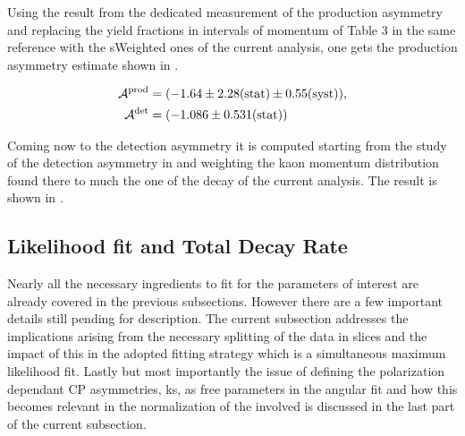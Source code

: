 Using the result from the dedicated \lhcb measurement of the production asymmetry \cite{LHCb-PAPER-2014-042}
and replacing the yield fractions in intervals of \Bs momentum of Table 3 in the same reference with the sWeighted \BsJpsiKst ones of the current analysis,
one gets the production asymmetry estimate shown in .

\begin{subequations}
  \label{exp_assym}
  \begin{align}
    \centering
    \Aprod &= (-1.64 \pm 2.28 \stat \pm 0.55 \syst), \label{prod_assym} \\
    \Adet  &= (-1.086 \pm 0.531 \stat) \label{det_assym}
  \end{align}
\end{subequations}

\noindent Coming now to the detection asymmetry it is computed starting from the \lhcb study of the detection asymmetry
in\cite{LHCb-PAPER-2014-013} and weighting the kaon momentum distribution found there to much the one of the \BsJpsiKst
decay of the current analysis. The result is shown in .

\subsection{Likelihood fit and Total Decay Rate}
\label{Total_Decay_Rate}

Nearly all the necessary ingredients to fit for the parameters of interest are already covered in the previous subsections.
However there are a few important details still pending for description. The current subsection addresses the
implications arising from the necessary splitting of the data in slices and the impact of this in the adopted
fitting strategy which is a simultaneous maximum likelihood fit. Lastly but most importantly the issue of defining
the polarization dependant CP asymmetries, \Acp{k}, as free parameters in the angular fit and how this becomes
relevant in the normalization of the \pdfs involved is discussed in the last part of the current subsection.

